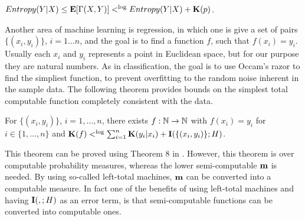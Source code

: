 \documentclass[11pt]{article}\textwidth 6.5in\textheight 9in
\begin{document}
\begin{thr} $Entropy(Y|X)\leq{\mathbf E}[\Gamma(X,Y)]<^{\log} Entropy(Y|X)+{\mathbf K}(p)$.
\end{thr}

Another area of machine learning is regression, in which one is give a set of pairs $\{(x_i,y_i)\}$, $i=1\dots n$, and the goal is to find a function $f$, such that $f(x_i)=y_i$. Usually each $x_i$ and $y_i$ represents a point in Euclidean space, but for our purpose they are natural numbers. As in classification, the goal is to use Occam's razor to find the simpliest function, to prevent overfitting to the random noise inherent in the sample data. The following theorem provides bounds on the simplest total computable function completely consistent with the data.
\begin{thr}
For $\{(x_i,y_i)\}$, $i=1,\dots,n$,  there exists $f:\mathbb{N}\rightarrow\mathbb{N}$ with $f(x_i)= y_i$ for $i\in\{1,\dots,n\}$ and ${\mathbf K}(f) <^{\log} \sum_{i=1}^n{\mathbf K}(y_i|x_i)+{\mathbf I}(\{(x_i,y_i)\};H)$.
\end{thr}

This theorem can be proved using Theorem 8 in \cite{EpsteinDerandom22}. However, this theorem is over computable probability measures, whereas the lower semi-computable ${\mathbf {m}}$ is needed. By using so-called left-total machines, ${\mathbf {m}}$ can be converted into a computable measure. In fact one of the benefits of using left-total machines and having ${\mathbf I}(,;H)$ as an error term, is that semi-computable functions can be converted into computable ones.
 

\end{document}
